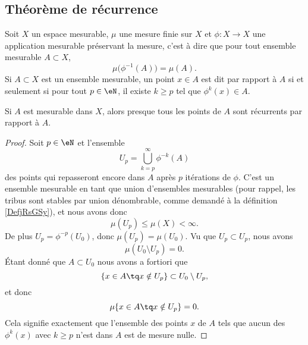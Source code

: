 \subsection{Théorème de récurrence}

Soit \( X\) un espace mesurable, \( \mu\) une mesure finie sur \( X\) et \( \phi\colon X\to X\) une application mesurable préservant la mesure, c'est à dire que pour tout ensemble mesurable \( A\subset X\),
\begin{equation}
    \mu\big( \phi^{-1}(A) \big)=\mu(A).
\end{equation}
Si \( A\subset X\) est un ensemble mesurable, un point \( x\in A\) est dit  par rapport à \( A\) si et seulement si pour tout \( p\in \eN\), il existe \( k\geq p\) tel que \( \phi^k(x)\in A\).

\begin{theorem}     \label{ThoYnLNEL}
    Si \( A\) est mesurable dans \( X\), alors presque tous les points de \( A\) sont récurrents par rapport à \( A\).
\end{theorem}

\begin{proof}
    Soit \( p\in \eN\) et l'ensemble
    \begin{equation}
        U_p=\bigcup_{k=p}^{\infty}\phi^{-k}(A)
    \end{equation}
    des points qui repasseront encore dans \( A\) après \( p\) itérations  de \( \phi\). C'est un ensemble mesurable en tant que union d'ensembles mesurables (pour rappel, les tribus sont stables par union dénombrable, comme demandé à la définition \ref{DefjRsGSy}), et nous avons donc
    \begin{equation}
        \mu(U_p)\leq \mu(X)<\infty.
    \end{equation}
    De plus \( U_p=\phi^{-p}(U_0)\), donc \( \mu(U_p)=\mu(U_0)\). Vu que \( U_p\subset U_p\), nous avons
    \begin{equation}
        \mu(U_0\setminus U_p)=0.
    \end{equation}
    Étant donné que \( A\subset U_0\) nous avons a fortiori que
    \begin{equation}
        \{ x\in A\tq x\notin U_p \}\subset U_0\setminus U_p,
    \end{equation}
    et donc
    \begin{equation}
        \mu\{ x\in A\tq x\notin U_p \}=0.
    \end{equation}
    Cela signifie exactement que l'ensemble des points \( x\) de \( A\) tels que aucun des \( \phi^k(x)\) avec \( k\geq p\) n'est dans \( A\) est de mesure nulle.
\end{proof}


